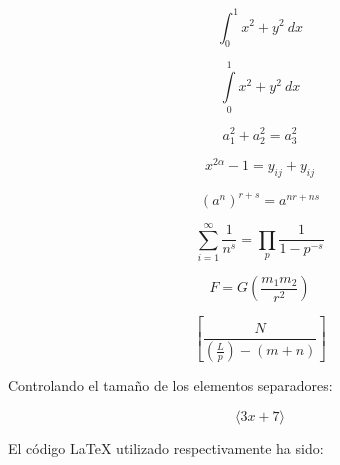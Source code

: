 \documentclass[12pt,a4paper,]{book}
\numberwithin{dummy}{section}
\theoremstyle{ocrenumbox}
\theoremstyle{blacknumex}
\theoremstyle{blacknumbox}
\theoremstyle{ocrenum}
\theoremstyle{ocrenum}
\begin{document}
\[ \int_0^1 x^2 + y^2 \ dx \]

\[ \int\limits_0^1 x^2 + y^2 \ dx \]

\[ a_1^2 + a_2^2 = a_3^2 \]

\[ x^{2 \alpha} - 1 = y_{ij} + y_{ij}  \]

\[ (a^n)^{r+s} = a^{nr+ns}  \]

\[ \sum_{i=1}^{\infty} \frac{1}{n^s} 
= \prod_p \frac{1}{1 - p^{-s}} \]

\[ 
F = G \left( \frac{m_1 m_2}{r^2} \right)
\]

\[ 
 \left[  \frac{ N } { \left( \frac{L}{p} \right)  - (m+n) }  \right]
\]

Controlando el tamaño de los elementos separadores:

\[
 \Bigg \langle 3x+7 \bigg \rangle
\]

El código LaTeX utilizado respectivamente ha sido:
\end{document}

